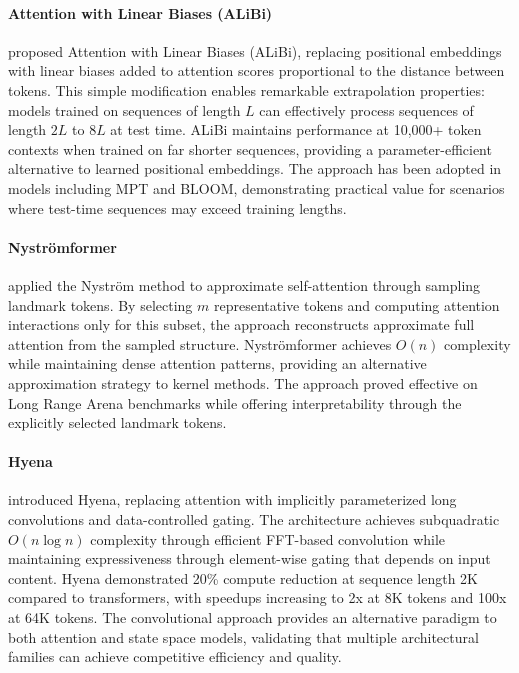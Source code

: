 \paragraph{Attention with Linear Biases (ALiBi)}

\citet{press2022train} proposed Attention with Linear Biases (ALiBi), replacing positional embeddings with linear biases added to attention scores proportional to the distance between tokens. This simple modification enables remarkable extrapolation properties: models trained on sequences of length $L$ can effectively process sequences of length $2L$ to $8L$ at test time. ALiBi maintains performance at 10,000+ token contexts when trained on far shorter sequences, providing a parameter-efficient alternative to learned positional embeddings. The approach has been adopted in models including MPT and BLOOM, demonstrating practical value for scenarios where test-time sequences may exceed training lengths.

\paragraph{Nyströmformer}

\citet{xiong2021nystromformer} applied the Nyström method to approximate self-attention through sampling landmark tokens. By selecting $m$ representative tokens and computing attention interactions only for this subset, the approach reconstructs approximate full attention from the sampled structure. Nyströmformer achieves $O(n)$ complexity while maintaining dense attention patterns, providing an alternative approximation strategy to kernel methods. The approach proved effective on Long Range Arena benchmarks while offering interpretability through the explicitly selected landmark tokens.

\paragraph{Hyena}

\citet{poli2023hyena} introduced Hyena, replacing attention with implicitly parameterized long convolutions and data-controlled gating. The architecture achieves subquadratic $O(n \log n)$ complexity through efficient FFT-based convolution while maintaining expressiveness through element-wise gating that depends on input content. Hyena demonstrated 20\% compute reduction at sequence length 2K compared to transformers, with speedups increasing to 2x at 8K tokens and 100x at 64K tokens. The convolutional approach provides an alternative paradigm to both attention and state space models, validating that multiple architectural families can achieve competitive efficiency and quality.

